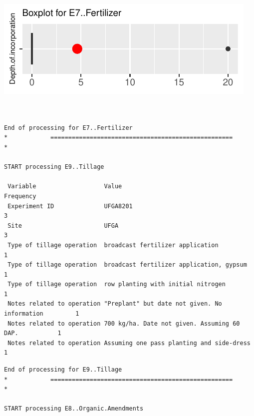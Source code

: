 \documentclass[
]{article}
\begin{document}
\includegraphics{FL_Crop_BMP_QA_single_dataset_files/figure-latex/check-content-of-sheets-12.pdf}

\begin{verbatim}


End of processing for E7..Fertilizer
*            ===================================================            *

START processing E9..Tillage

 Variable                   Value                                         Frequency
 Experiment ID              UFGA8201                                              3
 Site                       UFGA                                                  3
 Type of tillage operation  broadcast fertilizer application                      1
 Type of tillage operation  broadcast fertilizer application, gypsum              1
 Type of tillage operation  row planting with initial nitrogen                    1
 Notes related to operation "Preplant" but date not given. No information         1
 Notes related to operation 700 kg/ha. Date not given. Assuming 60 DAP.           1
 Notes related to operation Assuming one pass planting and side-dress             1
\end{verbatim}

\begin{verbatim}
End of processing for E9..Tillage
*            ===================================================            *

START processing E8..Organic.Amendments
\end{verbatim}
\end{document}
